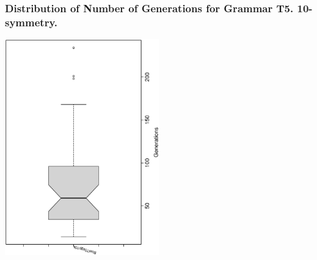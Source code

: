  \begin{frame}
 \frametitle{ Distribution of Number of Generations for Grammar T5. 10-symmetry. }
 \begin{center}
\includegraphics[width=0.5\textwidth, angle=-90]
{ExpFboxplottGenerations008.eps}
 \end{center}
 \label{ExpFboxplottGenerations008.eps}  
 \end{frame}

